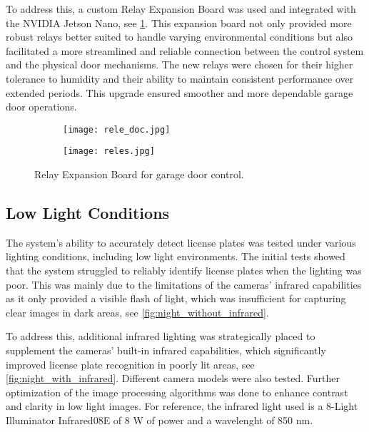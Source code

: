 To address this, a custom Relay Expansion Board was used and integrated with the NVIDIA Jetson Nano, see \cref{fig:relay_expansion_board}. This expansion board not only provided more robust relays better suited to handle varying environmental conditions but also facilitated a more streamlined and reliable connection between the control system and the physical door mechanisms. The new relays were chosen for their higher tolerance to humidity and their ability to maintain consistent performance over extended periods. This upgrade ensured smoother and more dependable garage door operations.

\begin{figure}
	\hfill
	\begin{subfigure}{0.45\textwidth}
		\texttt{[image: rele\_doc.jpg]}
	\end{subfigure}
	\hfill
	\begin{subfigure}{0.45\textwidth}
		\texttt{[image: reles.jpg]}
	\end{subfigure}
	\hfill

	\caption{Relay Expansion Board for garage door control.}\label{fig:relay_expansion_board}
\end{figure}


\subsection{Low Light Conditions}

The system's ability to accurately detect license plates was tested under various lighting conditions, including low light environments. The initial tests showed that the system struggled to reliably identify license plates when the lighting was poor. This was mainly due to the limitations of the cameras' infrared capabilities as it only provided a visible flash of light, which was insufficient for capturing clear images in dark areas, see \cref{fig:night_without_infrared}.

To address this, additional infrared lighting was strategically placed to supplement the cameras' built-in infrared capabilities, which significantly improved license plate recognition in poorly lit areas, see \cref{fig:night_with_infrared}. Different camera models were also tested. Further optimization of the image processing algorithms was done to enhance contrast and clarity in low light images. For reference, the infrared light used is a 8-Light Illuminator Infrared08E of 8 W of power and a wavelenght of 850 nm.


